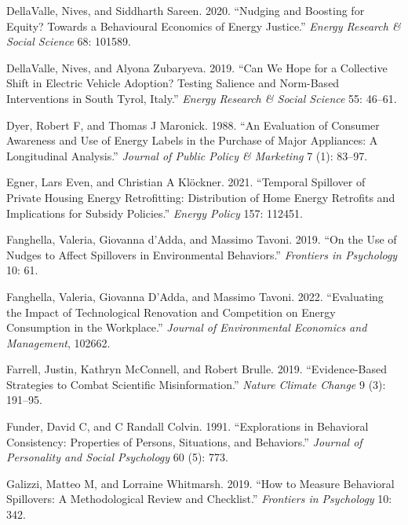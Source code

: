 \documentclass[
  11pt,
]{article}
\newlength{\cslhangindent}
\newlength{\cslentryspacingunit} %
\newenvironment{CSLReferences}[2] %
 {%
  \setlength{\parindent}{0pt}
  \ifodd #1
  \let\oldpar\par
  \def\par{\hangindent=\cslhangindent\oldpar}
  \fi
  \setlength{\parskip}{#2\cslentryspacingunit}
 }%
 {}
\begin{document}
\begin{CSLReferences}{1}{0}
\leavevmode{}%
DellaValle, Nives, and Siddharth Sareen. 2020. {``Nudging and Boosting
for Equity? Towards a Behavioural Economics of Energy Justice.''}
\emph{Energy Research \& Social Science} 68: 101589.

\leavevmode{}%
DellaValle, Nives, and Alyona Zubaryeva. 2019. {``Can We Hope for a
Collective Shift in Electric Vehicle Adoption? Testing Salience and
Norm-Based Interventions in South Tyrol, Italy.''} \emph{Energy Research
\& Social Science} 55: 46--61.

\leavevmode{}%
Dyer, Robert F, and Thomas J Maronick. 1988. {``An Evaluation of
Consumer Awareness and Use of Energy Labels in the Purchase of Major
Appliances: A Longitudinal Analysis.''} \emph{Journal of Public Policy
\& Marketing} 7 (1): 83--97.

\leavevmode{}%
Egner, Lars Even, and Christian A Klöckner. 2021. {``Temporal Spillover
of Private Housing Energy Retrofitting: Distribution of Home Energy
Retrofits and Implications for Subsidy Policies.''} \emph{Energy Policy}
157: 112451.

\leavevmode{}%
Fanghella, Valeria, Giovanna d'Adda, and Massimo Tavoni. 2019. {``On the
Use of Nudges to Affect Spillovers in Environmental Behaviors.''}
\emph{Frontiers in Psychology} 10: 61.

\leavevmode{}%
Fanghella, Valeria, Giovanna D'Adda, and Massimo Tavoni. 2022.
{``Evaluating the Impact of Technological Renovation and Competition on
Energy Consumption in the Workplace.''} \emph{Journal of Environmental
Economics and Management}, 102662.

\leavevmode{}%
Farrell, Justin, Kathryn McConnell, and Robert Brulle. 2019.
{``Evidence-Based Strategies to Combat Scientific Misinformation.''}
\emph{Nature Climate Change} 9 (3): 191--95.

\leavevmode{}%
Funder, David C, and C Randall Colvin. 1991. {``Explorations in
Behavioral Consistency: Properties of Persons, Situations, and
Behaviors.''} \emph{Journal of Personality and Social Psychology} 60
(5): 773.

\leavevmode{}%
Galizzi, Matteo M, and Lorraine Whitmarsh. 2019. {``How to Measure
Behavioral Spillovers: A Methodological Review and Checklist.''}
\emph{Frontiers in Psychology} 10: 342.


\end{CSLReferences}
\end{document}
